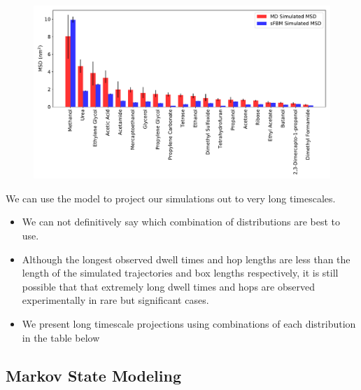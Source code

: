 \documentclass{article}
\begin{document}
  \begin{figure}
  \centering
  \includegraphics[width=\textwidth]{all_emsds.pdf}
  \caption{}\label{fig:all_msds}
  \end{figure}
  
  \noindent We can use the model to project our simulations out to very long timescales.
  \begin{itemize}
    \item We can not definitively say which combination of distributions are best to use.
    \item Although the longest observed dwell times and hop lengths are less than
    the length of the simulated trajectories and box lengths respectively, it is still possible
    that that extremely long dwell times and hops are observed experimentally in rare but
    significant cases.
    \item We present long timescale projections using combinations of each distribution in the
    table below
  \end{itemize}


  \subsection{Markov State Modeling}\label{section:msm_results}
  
\end{document}
